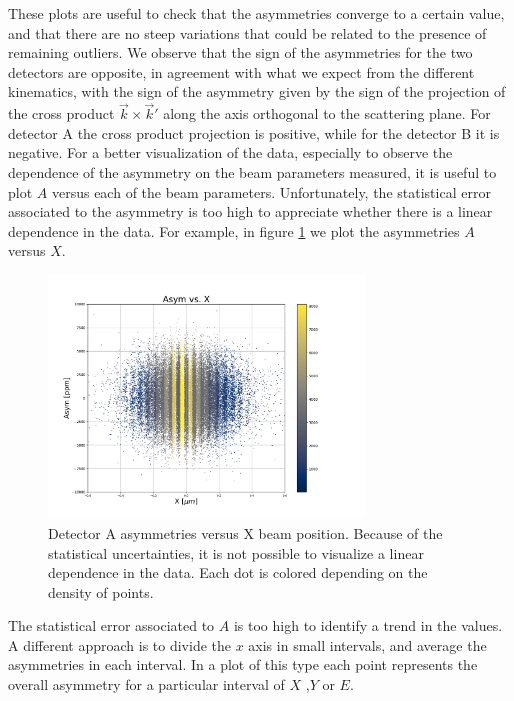 These plots are useful to check that the asymmetries converge to a certain value, and that there are no steep variations that could be related to the presence of remaining outliers. We observe that the sign of the asymmetries for the two detectors are opposite, in agreement with what we expect from the different kinematics, with the sign of the asymmetry given by the sign of the projection of the cross product $\vec{k} \times \vec{k}'$ along the axis orthogonal to the scattering plane. For detector A the cross product projection is positive, while for the detector B it is negative.
For a better visualization of the data, especially to observe the dependence of the asymmetry on the beam parameters measured, it is useful to plot $A$ versus each of the beam parameters. Unfortunately, the statistical error associated to the asymmetry is too high to appreciate whether there is a linear dependence in the data. For example, in figure \ref{fig:AsymmetryA0vrX} we plot the asymmetries $A$ versus $X$.

\begin{figure}[!hbtp]
\centering
\includegraphics[width = 0.75\textwidth]{Analysis/Fit/A_vs_X.pdf}
\caption{Detector A asymmetries versus X beam position. Because of the statistical uncertainties, it is not possible to visualize a linear dependence in the data. Each dot is colored depending on the density of points.}
\label{fig:AsymmetryA0vrX}
\end{figure}

The statistical error associated to $A$ is too high to identify a trend in the values. A different approach is to divide the $x$ axis in small intervals, and average the asymmetries in each interval. In a plot of this type each point represents the overall asymmetry for a particular interval of $X$ ,$Y$ or $E$.
 
